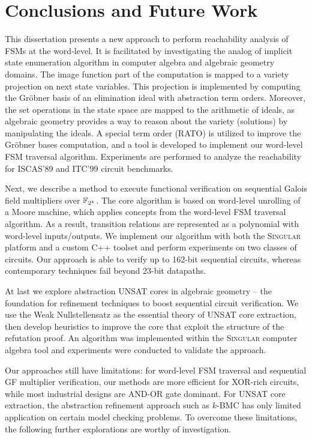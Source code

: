 \chapter{Conclusions and Future Work}
\label{ch:conclude}
This dissertation presents a new approach to perform reachability
analysis of FSMs at the word-level. It is facilitated by investigating the analog of 
implicit state enumeration algorithm in computer algebra and algebraic
geometry domains. The image function part of the computation is mapped to a variety projection on 
next state variables. This projection is implemented by computing the 
Gr\"obner basis of an elimination ideal with abstraction term orders.
Moreover, the set operations in the state space are mapped to 
the arithmetic of ideals, as algebraic geometry provides a 
way to reason about the variety (solutions) by manipulating the ideals.
A special term order (RATO) is utilized to improve the Gr\"obner bases 
computation, and a tool is developed to implement our 
word-level FSM traversal algorithm. Experiments are performed to 
analyze the reachability for ISCAS'89 and ITC'99 circuit benchmarks.

Next, we describe a method to execute functional verification on sequential Galois field
multipliers over ${\mathbb{F}}_{2^k}$.  The core algorithm is based on word-level unrolling of 
a Moore machine, which applies concepts from the word-level FSM traversal 
algorithm. As a result, transition relations are represented 
as a polynomial with word-level inputs/outputs.
We implement our algorithm with both the \textsc{Singular} platform and a custom C++ toolset 
and perform experiments on two classes of circuits.
Our approach is able to verify up to 162-bit sequential
circuits, whereas contemporary techniques fail beyond 23-bit
datapaths.  

At last we explore abstraction UNSAT cores in algebraic geometry -- the foundation for refinement techniques
to boost sequential circuit verification.
We use the Weak Nullstellensatz as the essential theory of UNSAT core extraction, 
then develop heuristics to improve the core that exploit the structure of the refutation proof.
An algorithm was implemented within the \textsc{Singular} computer algebra tool
and experiments were conducted to validate the approach.

Our approaches still have limitations: for word-level FSM traversal and 
sequential GF multiplier verification, our methods are more efficient
for XOR-rich circuits, while most industrial designs are AND-OR gate dominant.
For UNSAT core extraction, the abstraction refinement approach such as $k$-BMC 
has only limited application on certain model checking problems. To overcome these limitations,
the following further explorations are worthy of investigation. 
  
